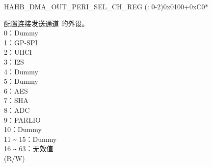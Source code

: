 \begin{register}{H}{AHB\_DMA\_OUT\_PERI\_SEL\_CH\_REG (: 0-2)}{0x0100+0xC0*}\label{regdesc:AHBDMAOUTPERISELCHNREG}
%
%
\regnewline%
\begin{regdesc}\begin{reglist}
\label{fielddesc:AHBDMAPERIOUTSELCHN}\item [AHB\_DMA\_PERI\_OUT\_SEL\_CH\regindex{n}] 配置连接发送通道  的外设。\\
0：Dummy\\ 1：GP-SPI\\ 2：UHCI\\ 3：I2S\\ 4：Dummy\\ 5：Dummy\\ 6：AES\\ 7：SHA\\ 8：ADC\\ 9：PARLIO\\ 10：Dummy\\ 11 \verb+~+ 15：Dummy\\
16 \verb+~+ 63：无效值\\ (R/W)
\end{reglist}\end{regdesc}
\end{register}


